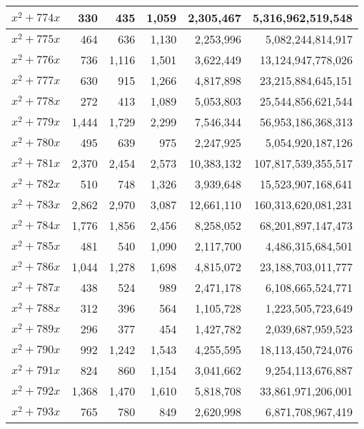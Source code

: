 \documentclass[a4paper]{amsproc}
\theoremstyle{plain}
\theoremstyle{named}
\begin{document}
\begin{longtable}{ | l | r | r | r | r | r | }
$x^2 + 774x$ & 330 & 435 & 1{,}059 & 2{,}305{,}467 & 5{,}316{,}962{,}519{,}548 \\ \hline
$x^2 + 775x$ & 464 & 636 & 1{,}130 & 2{,}253{,}996 & 5{,}082{,}244{,}814{,}917 \\ \hline
$x^2 + 776x$ & 736 & 1{,}116 & 1{,}501 & 3{,}622{,}449 & 13{,}124{,}947{,}778{,}026 \\ \hline
$x^2 + 777x$ & 630 & 915 & 1{,}266 & 4{,}817{,}898 & 23{,}215{,}884{,}645{,}151 \\ \hline
$x^2 + 778x$ & 272 & 413 & 1{,}089 & 5{,}053{,}803 & 25{,}544{,}856{,}621{,}544 \\ \hline
$x^2 + 779x$ & 1{,}444 & 1{,}729 & 2{,}299 & 7{,}546{,}344 & 56{,}953{,}186{,}368{,}313 \\ \hline
$x^2 + 780x$ & 495 & 639 & 975 & 2{,}247{,}925 & 5{,}054{,}920{,}187{,}126 \\ \hline
$x^2 + 781x$ & 2{,}370 & 2{,}454 & 2{,}573 & 10{,}383{,}132 & 107{,}817{,}539{,}355{,}517 \\ \hline
$x^2 + 782x$ & 510 & 748 & 1{,}326 & 3{,}939{,}648 & 15{,}523{,}907{,}168{,}641 \\ \hline
$x^2 + 783x$ & 2{,}862 & 2{,}970 & 3{,}087 & 12{,}661{,}110 & 160{,}313{,}620{,}081{,}231 \\ \hline
$x^2 + 784x$ & 1{,}776 & 1{,}856 & 2{,}456 & 8{,}258{,}052 & 68{,}201{,}897{,}147{,}473 \\ \hline
$x^2 + 785x$ & 481 & 540 & 1{,}090 & 2{,}117{,}700 & 4{,}486{,}315{,}684{,}501 \\ \hline
$x^2 + 786x$ & 1{,}044 & 1{,}278 & 1{,}698 & 4{,}815{,}072 & 23{,}188{,}703{,}011{,}777 \\ \hline
$x^2 + 787x$ & 438 & 524 & 989 & 2{,}471{,}178 & 6{,}108{,}665{,}524{,}771 \\ \hline
$x^2 + 788x$ & 312 & 396 & 564 & 1{,}105{,}728 & 1{,}223{,}505{,}723{,}649 \\ \hline
$x^2 + 789x$ & 296 & 377 & 454 & 1{,}427{,}782 & 2{,}039{,}687{,}959{,}523 \\ \hline
$x^2 + 790x$ & 992 & 1{,}242 & 1{,}543 & 4{,}255{,}595 & 18{,}113{,}450{,}724{,}076 \\ \hline
$x^2 + 791x$ & 824 & 860 & 1{,}154 & 3{,}041{,}662 & 9{,}254{,}113{,}676{,}887 \\ \hline
$x^2 + 792x$ & 1{,}368 & 1{,}470 & 1{,}610 & 5{,}818{,}708 & 33{,}861{,}971{,}206{,}001 \\ \hline
$x^2 + 793x$ & 765 & 780 & 849 & 2{,}620{,}998 & 6{,}871{,}708{,}967{,}419 \\ \hline

\end{longtable}
\end{document}
